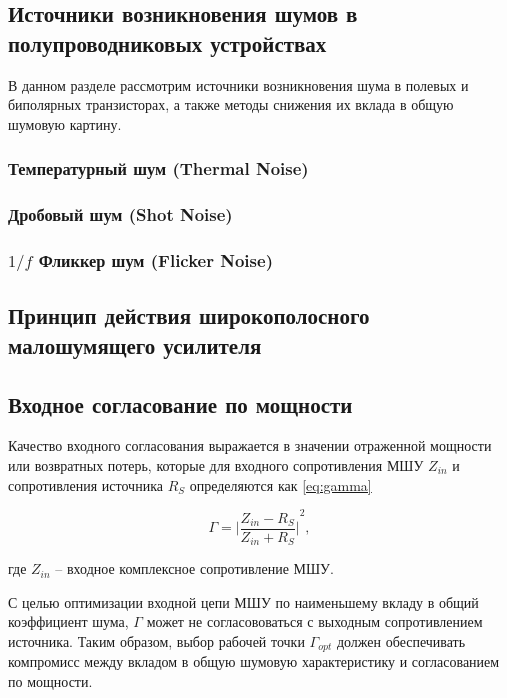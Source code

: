 \subsection{Источники возникновения шумов в полупроводниковых устройствах}
В данном разделе рассмотрим источники возникновения шума в полевых и биполярных транзисторах, а также методы снижения их вклада в общую шумовую картину.

\subsubsection{Температурный шум (Thermal Noise)}

\subsubsection{Дробовый шум (Shot Noise)}

\subsubsection{\(1/f\) Фликкер шум (Flicker Noise)}

\subsection{Принцип действия широкополосного малошумящего усилителя}

\subsection{Входное согласование по мощности}
Качество входного согласования выражается в значении отраженной мощности или возвратных потерь, которые для входного сопротивления МШУ \(Z_{in}\) и сопротивления источника \(R_S\) определяются как \eqref{eq:gamma}

\begin{equation}
\label{eq:gamma}
\Gamma = {\Bigg| \frac{Z_{in} - R_S}{Z_{in} + R_S} \Bigg|}^2 ,
\end{equation}

где \({Z_{in}}\) -- входное комплексное сопротивление МШУ. 

С целью оптимизации входной цепи МШУ по наименьшему вкладу в общий коэффициент шума, \(\Gamma\) может не согласововаться с выходным сопротивлением источника. Таким образом, выбор рабочей точки \(\Gamma_{opt}\) должен обеспечивать компромисс между вкладом в общую шумовую характеристику и согласованием по мощности.

